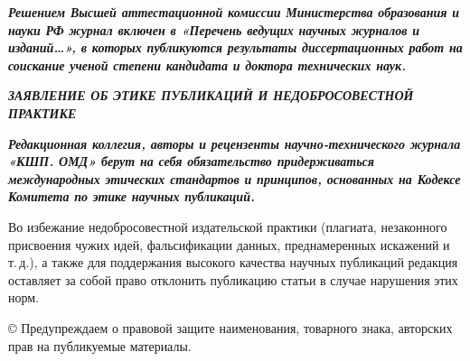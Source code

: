 \vfill

\scriptsize
\begin{center}
{\bfseries\itshape Решением Высшей аттестационной комиссии Министерства образования и науки РФ журнал включен
в «Перечень ведущих научных журналов и изданий…», в которых публикуются результаты диссертационных работ на соискание
ученой степени кандидата и доктора технических наук.}
\end{center}

\vspace{-1em}
\begin{center}
\bfseries\itshape
\MakeUppercase{заявление об этике публикаций и недобросовестной практике}
\end{center}

\vspace{-1em}
{\bfseries\itshape Редакционная коллегия, авторы и рецензенты научно-технического журнала «КШП. ОМД» берут на себя обязательство придерживаться международных этических стандартов и принципов, основанных на Кодексе Комитета по этике научных публикаций.

Во избежание недобросовестной издательской практики (плагиата, незаконного присвоения чужих идей, фальсификации данных,
преднамеренных искажений и т.\,д.), а также для поддержания высокого качества научных публикаций редакция оставляет за собой
право отклонить публикацию статьи в случае нарушения этих норм.}

\noindent © Предупреждаем о правовой защите наименования, товарного знака, авторских прав на публикуемые материалы.


\normalsize

